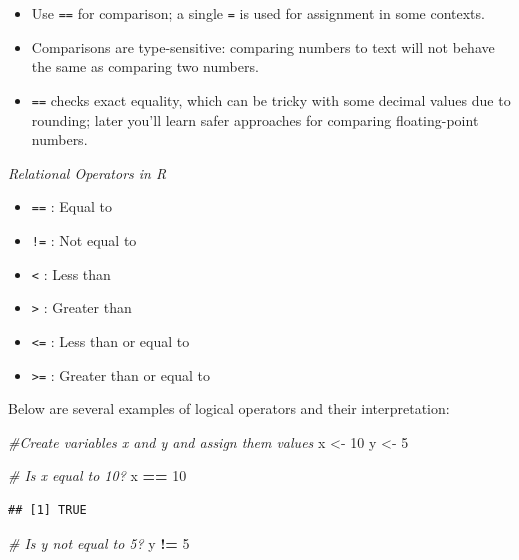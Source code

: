 \documentclass[
  11pt,
]{article}
\newenvironment{Shaded}{\begin{snugshade}}{\end{snugshade}}
\newcommand{\CommentTok}[1]{\textcolor[rgb]{0.56,0.35,0.01}{\textit{#1}}}
\newcommand{\DecValTok}[1]{\textcolor[rgb]{0.00,0.00,0.81}{#1}}
\newcommand{\NormalTok}[1]{#1}
\newcommand{\OtherTok}[1]{\textcolor[rgb]{0.56,0.35,0.01}{#1}}
\newcommand{\SpecialCharTok}[1]{\textcolor[rgb]{0.81,0.36,0.00}{\textbf{#1}}}
\providecommand{\tightlist}{%
  \setlength{\itemsep}{0pt}\setlength{\parskip}{0pt}}
\begin{document}
\begin{itemize}
\tightlist
\item
  Use \texttt{==} for comparison; a single \texttt{=} is used for
  assignment in some contexts.
\item
  Comparisons are type-sensitive: comparing numbers to text will not
  behave the same as comparing two numbers.
\item
  \texttt{==} checks exact equality, which can be tricky with some
  decimal values due to rounding; later you'll learn safer approaches
  for comparing floating-point numbers.
\end{itemize}

\emph{Relational Operators in R}

\begin{itemize}
\tightlist
\item
  \texttt{==} : Equal to
\item
  \texttt{!=} : Not equal to
\item
  \texttt{\textless{}} : Less than
\item
  \texttt{\textgreater{}} : Greater than
\item
  \texttt{\textless{}=} : Less than or equal to
\item
  \texttt{\textgreater{}=} : Greater than or equal to
\end{itemize}

Below are several examples of logical operators and their
interpretation:

\begin{Shaded}
\begin{Highlighting}[]
\CommentTok{\#Create variables x and y and assign them values}
\NormalTok{x }\OtherTok{\textless{}{-}} \DecValTok{10}
\NormalTok{y }\OtherTok{\textless{}{-}} \DecValTok{5}

\CommentTok{\# Is x equal to 10?}
\NormalTok{x }\SpecialCharTok{==} \DecValTok{10}
\end{Highlighting}
\end{Shaded}

\begin{verbatim}
## [1] TRUE
\end{verbatim}

\begin{Shaded}
\begin{Highlighting}[]
\CommentTok{\# Is y not equal to 5?}
\NormalTok{y }\SpecialCharTok{!=} \DecValTok{5}
\end{Highlighting}
\end{Shaded}
\end{document}
